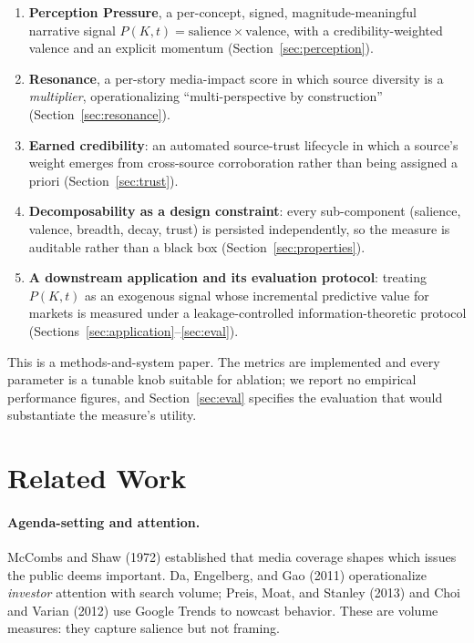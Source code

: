 \documentclass[11pt,a4paper]{article}
\theoremstyle{definition}
\begin{document}
\begin{enumerate}
  \item \textbf{Perception Pressure}, a per-concept, signed, magnitude-meaningful narrative signal
        $P(K,t) = \text{salience}\times\text{valence}$, with a credibility-weighted valence and an
        explicit momentum (Section~\ref{sec:perception}).
  \item \textbf{Resonance}, a per-story media-impact score in which source diversity is a
        \emph{multiplier}, operationalizing ``multi-perspective by construction''
        (Section~\ref{sec:resonance}).
  \item \textbf{Earned credibility}: an automated source-trust lifecycle in which a source's weight
        emerges from cross-source corroboration rather than being assigned a priori
        (Section~\ref{sec:trust}).
  \item \textbf{Decomposability as a design constraint}: every sub-component (salience, valence,
        breadth, decay, trust) is persisted independently, so the measure is auditable rather than a
        black box (Section~\ref{sec:properties}).
  \item \textbf{A downstream application and its evaluation protocol}: treating $P(K,t)$ as an
        exogenous signal whose incremental predictive value for markets is measured under a
        leakage-controlled information-theoretic protocol (Sections~\ref{sec:application}--\ref{sec:eval}).
\end{enumerate}

This is a methods-and-system paper. The metrics are implemented and every parameter is a tunable
knob suitable for ablation; we report no empirical performance figures, and Section~\ref{sec:eval}
specifies the evaluation that would substantiate the measure's utility.

\section{Related Work}
\label{sec:related}

\paragraph{Agenda-setting and attention.}
McCombs and Shaw (1972) established that media coverage shapes which issues the public deems
important. Da, Engelberg, and Gao (2011) operationalize \emph{investor} attention with search
volume; Preis, Moat, and Stanley (2013) and Choi and Varian (2012) use Google Trends to nowcast
behavior. These are volume measures: they capture salience but not framing.
\end{document}
